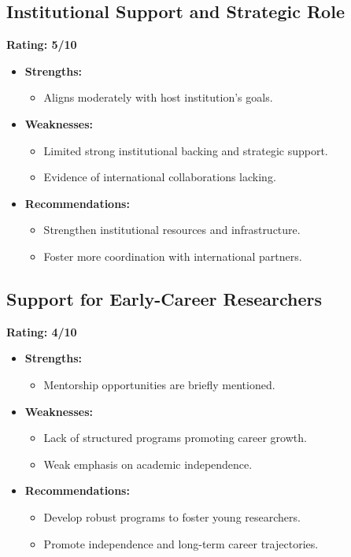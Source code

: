 \documentclass{article}
\begin{document}
\subsection{Institutional Support and Strategic Role}
\textbf{Rating: 5/10}
\begin{itemize}
    \item \textbf{Strengths:}
    \begin{itemize}
        \item Aligns moderately with host institution’s goals.
    \end{itemize}
    \item \textbf{Weaknesses:}
    \begin{itemize}
        \item Limited strong institutional backing and strategic support.
        \item Evidence of international collaborations lacking.
    \end{itemize}
    \item \textbf{Recommendations:}
    \begin{itemize}
        \item Strengthen institutional resources and infrastructure.
        \item Foster more coordination with international partners.
    \end{itemize}
\end{itemize}

\subsection{Support for Early-Career Researchers}
\textbf{Rating: 4/10}
\begin{itemize}
    \item \textbf{Strengths:}
    \begin{itemize}
        \item Mentorship opportunities are briefly mentioned.
    \end{itemize}
    \item \textbf{Weaknesses:}
    \begin{itemize}
        \item Lack of structured programs promoting career growth.
        \item Weak emphasis on academic independence.
    \end{itemize}
    \item \textbf{Recommendations:}
    \begin{itemize}
        \item Develop robust programs to foster young researchers.
        \item Promote independence and long-term career trajectories.
    \end{itemize}
\end{itemize}
\end{document}
